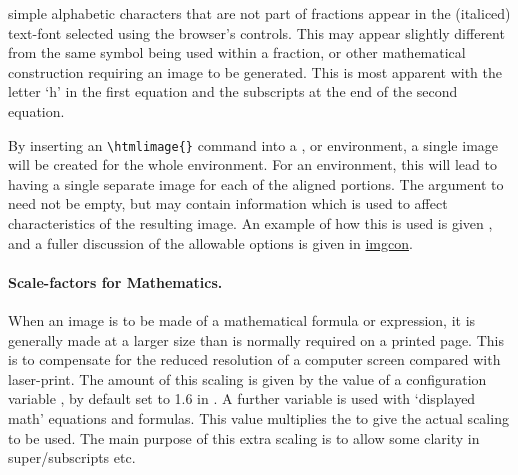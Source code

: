 \medskip\noindent
%
simple alphabetic characters that are not part of fractions appear
in the (italiced) text-font selected using the browser's controls.
This may appear slightly different from the same symbol being used
within a fraction, or other mathematical construction requiring an image
to be generated. This is most apparent with the letter `h' in the
first equation and the subscripts at the end of the second equation.


By inserting an \verb|\htmlimage{}| command into a ,
 or  environment, a single image
will be created for the whole environment. For an 
environment, this will lead to having a single separate image 
for each of the aligned portions. 
The argument to  need not be empty, but may contain
information which is used to affect characteristics of the resulting
image. An example of how this is used is given ,
and a fuller discussion of the allowable options is given in
\hyperref{the next section}{Section~}{}{imgcon}.


%
\paragraph*{Scale-factors for Mathematics.\label{mathscales}}
%
When an image is to be made of a mathematical formula or expression,
it is generally made at a larger size 
than is normally required on a printed page.
This is to compensate for the reduced resolution of a computer screen
compared with laser-print.  
The amount of this scaling is given by the
value of a configuration variable ,
by default set to 1.6 in . 
A further variable  is used with
`displayed math' equations and formulas.
This value multiplies the  
to give the actual scaling to be used.
The main purpose of this extra scaling is to allow some clarity in
super/subscripts etc.


%
